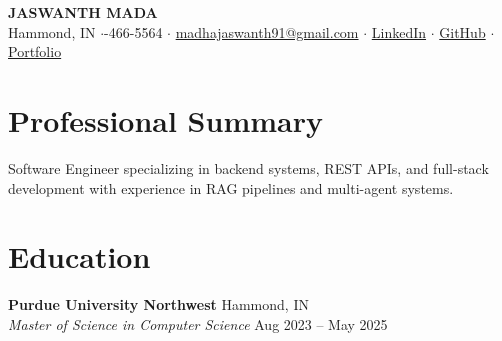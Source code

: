 \documentclass[10pt, letterpaper]{article}
\begin{document}
\begin{center}
    {\Huge \bfseries \color{primary} JASWANTH MADA} \\[2pt]
    \small
    Hammond, IN \quad$\cdot$-466-5564 \quad$\cdot$\quad 
    \href{mailto:madhajaswanth91@gmail.com}{madhajaswanth91@gmail.com} \quad$\cdot$\quad 
    \href{https://www.linkedin.com/in/jaswanthmadha/}{LinkedIn} \quad$\cdot$\quad 
    \href{https://github.com/Jaswanth19-596/}{GitHub} \quad$\cdot$\quad 
    \href{https://madajaswanth.netlify.app/}{Portfolio}
\end{center}

\vspace{-6pt}

\section{Professional Summary}
Software Engineer specializing in backend systems, REST APIs, and full-stack development with experience in RAG pipelines and multi-agent systems.

\section{Education}
\textbf{Purdue University Northwest} \hfill Hammond, IN \\
\textit{Master of Science in Computer Science} \hfill Aug 2023 -- May 2025

\end{document}
